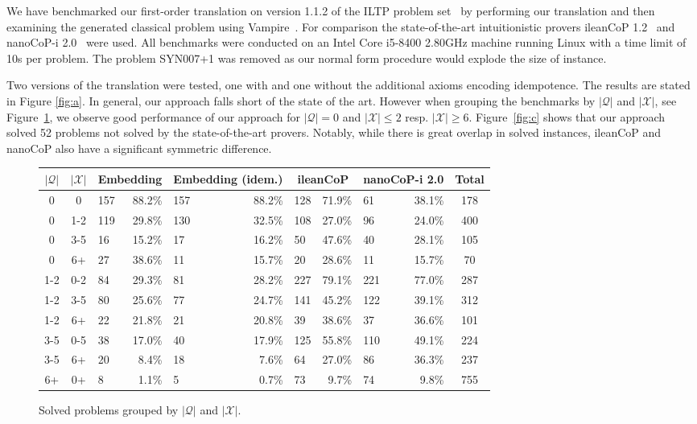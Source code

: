 \documentclass[runningheads]{llncs}
\begin{document}
We have benchmarked our first-order translation on version 1.1.2 of the ILTP problem set~\cite{iltp} by performing our translation and then examining the generated classical problem using Vampire~\cite{kovacs2013first}. 
For comparison the state-of-the-art intuitionistic provers ileanCoP 1.2~\cite{otten2008leancop} and nanoCoP-i 2.0~\cite{otten2021nanocop} were used. All benchmarks were conducted on an Intel Core i5-8400 2.80GHz machine running Linux with a time limit of 10s per problem. The problem \textsc{SYN007+1} was removed as our normal form procedure would explode the size of instance.

Two versions of the translation were tested, one with and one without the additional axioms encoding idempotence. The results are stated in Figure \ref{fig:a}. 
In general, our approach falls short of the state of the art. 
However when grouping the benchmarks by $|\mathcal Q|$ and $|\mathcal X|$, see Figure~\ref{fig:b},
we observe good performance of our approach for $|\mathcal Q| = 0$ and $|\mathcal X| \leq 2$ resp. $|\mathcal X| \geq 6$.
Figure~\ref{fig:c} shows that our approach solved 52 problems not solved by the state-of-the-art provers. Notably, while there is great overlap in solved instances, ileanCoP and nanoCoP also have a significant symmetric difference.\pagebreak
\begin{figure}
	\centering
	\begin{tabular}{c|c|lr|lr|lr|lr|c}
		$|\mathcal Q|$&$|\mathcal X|$&\multicolumn{2}{c}{Embedding}&\multicolumn{2}{c}{Embedding (idem.)}&\multicolumn{2}{c}{ileanCoP}&\multicolumn{2}{c}{nanoCoP-i 2.0}&Total\\\hline
		0&0		&157&88.2\%	&157&88.2\%		&128&71.9\%		&61&38.1\%	&178\\
		0&1-2	&119&29.8\%&130&32.5\%		&108&27.0\%		&96&24.0\%	&400\\
		0&3-5	&16&15.2\%	&17&16.2\%		&50&47.6\%		&40&28.1\%	&105\\
		0&6+	&27&38.6\%	&11&15.7\%		&20&28.6\%		&11&15.7\%	&70\\
		1-2&0-2	&84&29.3\%	&81&28.2\%		&227&79.1\%		&221&77.0\%	&287\\
		1-2&3-5	&80&25.6\%	&77&24.7\%		&141&45.2\%		&122&39.1\%	&312\\
		1-2&6+	&22&21.8\%	&21&20.8\%		&39&38.6\%		&37&36.6\%	&101\\
		3-5&0-5	&38&17.0\%	&40&17.9\%		&125&55.8\%		&110&49.1\%	&224\\
		3-5&6+  &20&8.4\%	&18&7.6\%		&64&27.0\%		&86&36.3\%	&237\\
		6+&0+	&8&1.1\%	&5&0.7\%		&73&9.7\%		&74&9.8\%	&755
	\end{tabular}
	\caption{Solved problems grouped by $|\mathcal Q|$ and $|\mathcal X|$.}
	\label{fig:b}
\end{figure}
\vspace*{-.5cm}
\end{document}
